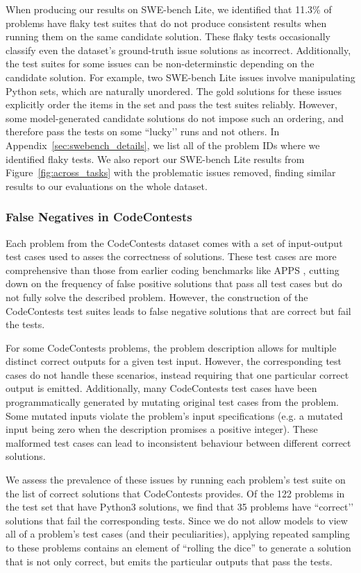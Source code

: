 \documentclass[11pt]{article}
\begin{document}
 
When producing our results on SWE-bench Lite, we identified that 11.3\% of problems have flaky test suites that do not produce consistent results when running them on the same candidate solution.
These flaky tests occasionally classify even the dataset's ground-truth issue solutions as incorrect. Additionally, the test suites for some issues can be non-determinstic depending on the candidate solution.
For example, two SWE-bench Lite issues involve manipulating Python sets, which are naturally unordered.
The gold solutions for these issues explicitly order the items in the set and pass the test suites reliably. However, some model-generated candidate solutions do not impose such an ordering, and therefore pass the tests on some ``lucky’’ runs and not others.
In Appendix~\ref{sec:swebench_details}, we list all of the problem IDs where we identified flaky tests. We also report our SWE-bench Lite results from Figure~\ref{fig:across_tasks} with the problematic issues removed, finding similar results to our evaluations on the whole dataset. 

\subsubsection{False Negatives in CodeContests}

Each problem from the CodeContests dataset comes with a set of input-output test cases used to asses the correctness of solutions. These test cases are more comprehensive than those from earlier coding benchmarks like APPS \cite{hendrycks2021measuringapps}, cutting down on the frequency of false positive solutions that pass all test cases but do not fully solve the described problem. However, the construction of the CodeContests test suites leads to false negative solutions that are correct but fail the tests.

For some CodeContests problems, the problem description allows for multiple distinct correct outputs for a given test input. However, the corresponding test cases do not handle these scenarios, instead requiring that one particular correct output is emitted. Additionally, many CodeContests test cases have been programmatically generated by mutating original test cases from the problem. Some mutated inputs violate the problem’s input specifications (e.g. a mutated input being zero when the description promises a positive integer). 
These malformed test cases can lead to inconsistent behaviour between different correct solutions.

We assess the prevalence of these issues by running each problem’s test suite on the list of correct solutions that CodeContests provides. Of the 122 problems in the test set that have Python3 solutions, we find that 35 problems have ``correct’’ solutions that fail the corresponding tests. Since we do not allow models to view all of a problem’s test cases (and their peculiarities), applying repeated sampling to these problems contains an element of “rolling the dice” to generate a solution that is not only correct, but emits the particular outputs that pass the tests.
\end{document}
